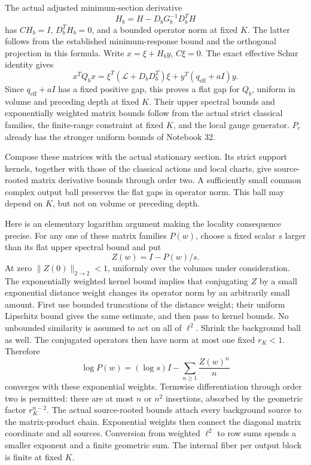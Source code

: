 The actual adjusted minimum-section derivative
\[
 H_b=H-D_bG_b^{-1}D_b^TH
\]
has \(CH_b=I\), \(D_b^TH_b=0\), and a bounded operator norm
at fixed \(K\). The latter follows from the established
minimum-response bound and the orthogonal projection
in this formula. Write \(x=\xi+H_by\), \(C\xi=0\).
The exact effective Schur identity gives
\[
 x^TQ_bx
  =\xi^T(\mathcal L+D_bD_b^T)\xi
                         +y^T(q_{\mathrm{eff}}+aI)y.
\]
Since \(q_{\mathrm{eff}}+aI\) has a fixed positive gap,
this proves a flat gap for \(Q_b\), uniform in volume
and preceding depth at fixed \(K\). Their upper spectral
bounds and exponentially weighted matrix bounds follow
from the actual strict classical families, the finite-range
constraint at fixed \(K\), and the local gauge generator.
\(P_c\) already has the stronger uniform bounds of Notebook 32.

Compose these matrices with the actual stationary section.
Its strict support kernels, together with those of the
classical actions and local charts, give source-rooted
matrix derivative bounds through order two. A sufficiently
small common complex output ball preserves the flat
gaps in operator norm. This ball may depend on \(K\),
but not on volume or preceding depth.

Here is an elementary logarithm argument making the
locality consequence precise. For any one of these
matrix families \(P(w)\), choose a fixed scalar \(s\)
larger than its flat upper spectral bound and put
\[
 Z(w)=I-P(w)/s.
\]
At zero \(\|Z(0)\|_{2\to2}<1\), uniformly over the
volumes under consideration. The exponentially weighted
kernel bound implies that conjugating \(Z\) by a small
exponential distance weight changes its operator norm
by an arbitrarily small amount. First use bounded
truncations of the distance weight; their uniform
Lipschitz bound gives the same estimate, and then pass
to kernel bounds. No unbounded similarity is assumed
to act on all of \(\ell^2\). Shrink the background
ball as well. The conjugated operators then have norm
at most one fixed \(r_K<1\). Therefore
\begin{equation}
 \log P(w)=(\log s)I-\sum_{n\ge1}\frac{Z(w)^n}{n}
 \label{gdd-log-series}
\end{equation}
converges with these exponential weights.
Termwise differentiation through order two is permitted:
there are at most \(n\) or \(n^2\) insertions, absorbed
by the geometric factor \(r_K^{n-2}\).
The actual source-rooted bounds attach every background
source to the matrix-product chain. Exponential weights
then connect the diagonal matrix coordinate and all
sources. Conversion from weighted \(\ell^2\) to row
sums spends a smaller exponent and a finite geometric
sum. The internal fiber per output block is finite
at fixed \(K\).

